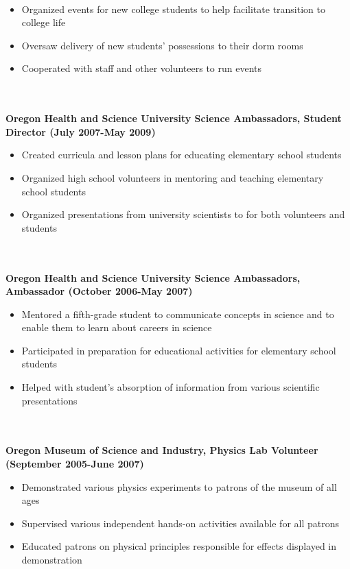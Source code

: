 \documentclass{article}
\begin{document}
\phantom \\
\begin{itemize}
\item Organized events for new college students to help facilitate transition to college life
\item Oversaw delivery of new students’ possessions to their dorm rooms
\item Cooperated with staff and other volunteers to run events
\end{itemize}
\phantom \\
\phantom \\
%
%
%
%
\noindent \textbf{Oregon Health and Science University Science Ambassadors, Student Director (July 2007-May 2009)}
\phantom \\
\begin{itemize}
\item Created curricula and lesson plans for educating elementary school students
\item Organized high school volunteers in mentoring and teaching elementary school students
\item Organized presentations from university scientists to for both volunteers and students
\end{itemize}
\phantom \\
\phantom \\
%
%
%
%
\noindent \textbf{Oregon Health and Science University Science Ambassadors, Ambassador (October 2006-May 2007)}
\phantom \\
\begin{itemize}
\item Mentored a fifth-grade student to communicate concepts in science and to enable them to learn about careers in science
\item Participated in preparation for educational activities for elementary school students
\item Helped with student’s absorption of information from various scientific presentations
\end{itemize}
\phantom \\
\phantom \\
%
%
%
%
\noindent \textbf{Oregon Museum of Science and Industry, Physics Lab Volunteer (September 2005-June 2007)}
\phantom \\
\begin{itemize}
\item Demonstrated various physics experiments to patrons of the museum of all ages
\item Supervised various independent hands-on activities available for all patrons
\item Educated patrons on physical principles responsible for effects displayed in demonstration
\end{itemize}
\phantom \\
\phantom \\
%
%
%
%
%
%
\end{document}
